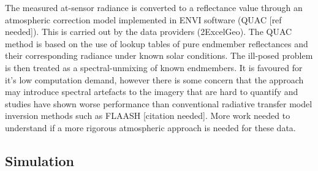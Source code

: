 \documentclass[10pt,a4paper,final,twocolumn]{article}
\begin{document}
The measured at-sensor radiance is converted to a reflectance value through an  atmospheric correction model implemented in ENVI software (QUAC [ref needed]). This is carried out by the data providers (2ExcelGeo). The QUAC method is based on the use of lookup tables of pure endmember reflectances and their corresponding radiance under known solar conditions. The ill-posed problem is then treated as a spectral-unmixing of known endmembers. It is favoured for it's low computation demand, however there is some concern that the approach may introduce spectral artefacts to the imagery that are hard to quantify and studies have shown worse performance than conventional radiative transfer model inversion methods such as FLAASH [citation needed]. More work needed to understand if a more rigorous atmospheric approach is needed for these data.

\subsection{Simulation}
\end{document}
